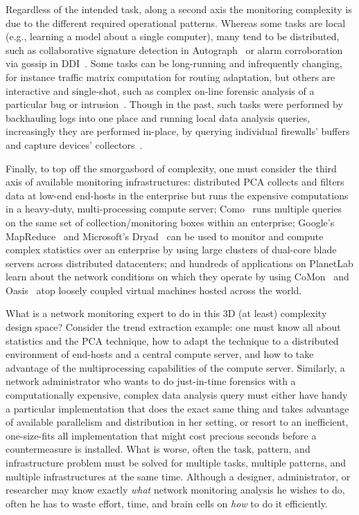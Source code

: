 \documentclass[10pt,twocolumn]{MyTightStyle}
\begin{document}
Regardless of the intended task, along a second axis
the monitoring complexity is due to the different required operational
patterns. Whereas some tasks are local (e.g., learning a model about a
single computer), many tend to be distributed, such as collaborative
signature detection in Autograph~\cite{kim04} or alarm corroboration via
gossip in DDI~\cite{dash06}. Some tasks can be long-running and
infrequently changing, for instance traffic matrix computation for
routing adaptation, but others are interactive and single-shot, such as
complex on-line forensic analysis of a particular bug or
intrusion~\cite{Tucek2006}. Though in the past, such tasks were performed by
backhauling logs into one place and running local data analysis queries,
increasingly they are performed in-place, by querying individual
firewalls' buffers and capture devices' collectors~\cite{barletros07}.

Finally, to top off the smorgasbord of complexity, one must consider the
third axis of available monitoring infrastructures: distributed PCA
collects and filters data at low-end end-hosts in the enterprise but
runs the expensive computations in a heavy-duty, multi-processing
compute server; Como~\cite{barletros07} runs multiple queries on the same
set of collection/monitoring boxes within an enterprise; Google's
MapReduce~\cite{dean04} and Microsoft's Dryad~\cite{isard07} can be used
to monitor and compute complex statistics over an enterprise by using
large clusters of dual-core blade servers across distributed
datacenters; and hundreds of applications on PlanetLab learn about the
network conditions on which they operate by using CoMon~\cite{park06} and
Oasis~\cite{freedman06} atop loosely coupled virtual machines hosted
across the world.


What is a network monitoring expert to do in this 3D (at least)
complexity design space? Consider the trend extraction example: one must know
all about statistics and the PCA technique, how to adapt the
technique to a distributed environment of end-hosts and a central
compute server, and how to take advantage of the multiprocessing
capabilities of the compute server. Similarly, a network
administrator who wants to do just-in-time forensics with a
computationally expensive, complex data analysis query must either have handy a
particular implementation that does the exact same thing and takes
advantage of available parallelism and 
distribution in her setting, or resort to an inefficient, one-size-fits all
implementation that might cost precious seconds before a countermeasure
is installed.  What is worse, often the task, pattern, and infrastructure
problem must be solved for multiple tasks, multiple patterns, and
multiple infrastructures at the same time.  Although a designer, administrator, or researcher may know
exactly \emph{what} network monitoring analysis he wishes to do, often he has to waste
effort, time, and brain cells on \emph{how} to do it efficiently.
\end{document}
